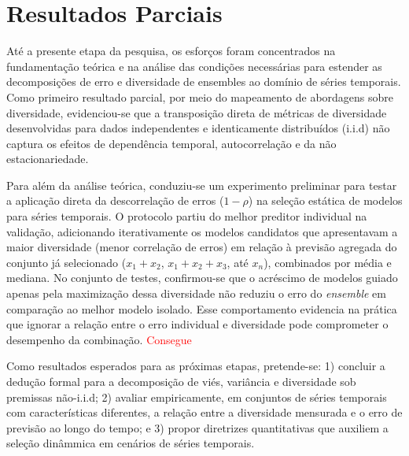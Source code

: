 \chapter{Resultados Parciais}

Até a presente etapa da pesquisa, os esforços foram concentrados na fundamentação teórica e na análise das condições necessárias para estender as decomposições de erro e diversidade de ensembles ao domínio de séries temporais. Como primeiro resultado parcial, por meio do mapeamento de abordagens sobre diversidade, evidenciou-se que a transposição direta de métricas de diversidade desenvolvidas para dados independentes e identicamente distribuídos (i.i.d) não captura os efeitos de dependência temporal, autocorrelação e da não estacionariedade.

Para além da análise teórica, conduziu-se um experimento preliminar para testar a aplicação direta da descorrelação de erros ($1 - \rho$) na seleção estática de modelos para séries temporais. O protocolo partiu do melhor preditor individual na validação, adicionando iterativamente os modelos candidatos que apresentavam a maior diversidade (menor correlação de erros) em relação à previsão agregada do conjunto já selecionado ($x_1 + x_2$, $x_1 + x_2 + x_3$, até $x_n$), combinados por média e mediana. No conjunto de testes, confirmou-se que o acréscimo de modelos guiado apenas pela maximização dessa diversidade não reduziu o erro do \textit{ensemble} em comparação ao melhor modelo isolado. Esse comportamento evidencia na prática que ignorar a relação entre o erro individual e diversidade pode comprometer o desempenho da combinação. \textcolor{red}{Consegue }

Como resultados esperados para as próximas etapas, pretende-se: 1) concluir a dedução formal para a decomposição de viés, variância e diversidade sob premissas não-i.i.d; 2) avaliar empiricamente, em conjuntos de séries temporais com características diferentes, a relação entre a diversidade mensurada e o erro de previsão ao longo do tempo; e 3) propor diretrizes quantitativas que auxiliem a seleção dinâmmica em cenários de séries temporais.